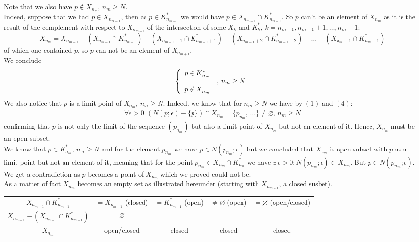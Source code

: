 Note that we also have $p\not \in X_{n_m},\, n_m\geq N$.\\ Indeed, suppose that we had $p\in X_{n_{m-1}}$, then as $p\in K^{*}_{n_{m-1}}$ we would have $p\in X_{n_{m-1}}\cap K^{*}_{n_{m-1}}$. So $p$ can't be an element of  $X_{n_{m}}$ as it is the result of the complement with respect to $X_{n_{m-1}}$ of the intersection of some $X_{k}$ and $K^{*}_{k},\ k=n_{m-1},n_{m-1}+1,\dots, n_{m}-1$:
$$ X_{n_{m}}=X_{n_{m-1}}- ( X_{n_{m-1}}\cap K^{*}_{n_{m-1}})- ( X_{n_{m-1}+1}\cap K^{*}_{n_{m-1}+1})- ( X_{n_{m-1}+2}\cap K^{*}_{n_{m-1}+2})-\dots - ( X_{n_{m}-1}\cap K^{*}_{n_{m}-1})$$
of which one contained $p$, so $p$ can not be an element of $X_{n_{m+1}}$.\\
We conclude
\begin{align*}
\left\{\begin{array}{l l}
p\in  K^{*}_{n_m}\\
&,\, n_m\geq N\\
p\not \in  X^{}_{n_m}
\end{array}\right.
\end{align*}
We also notice that $p$ is a limit point of $X_{n_{m}},\, n_m\geq N$. Indeed, we know that for $n_m\geq N$ we have by $(1)$ and $(4)$:
\begin{align*}
\forall\epsilon >0: \left(N(p;\epsilon)-\{p\}\right)\cap X_{n_m}=\{p_{n_m},\, \dots \}\neq \varnothing,\, n_m\geq N
\end{align*}
confirming that $p$ is not only the limit of the sequence $(p_{n_m})$ but also a limit point of $X^{}_{n_m}$ but not an element of it. Hence, $X^{}_{n_m}$ must be an open subset.\\
We know that $p\in K^{*}_{n_m},\, n_m\geq N$ and for the element $p_{n_m}$ we have $p\in N(p_{n_m};\epsilon)$ but we concluded that $X^{}_{n_m}$ is open subset with $p$ as a limit point but not an element of it, meaning that for the point $p_{n_m}\in X_{n_m}\cap K^{*}_{n_m}$ we have $\exists\,  \epsilon>0: N(p_{n_m};\epsilon)\subset X_{n_m}$. But $p\in N(p_{n_m};\epsilon)$. We get a contradiction as $p$ becomes a point of $X_{n_m} $ which we proved could not be.\\
As a matter of fact $X_{n_m}$ becomes an empty set as illustrated hereunder (starting with $X_{n_{m-1}}$, a closed susbet).
\begin{table}[H]
\centering
\begin{tabular}{|c|c|c|c|c|}
\hline
& &  &  & \\ 
\hline
 $X_{n_{m-1}}\cap K^{*}_{n_{m-1}}$ &  $=X_{n_{m-1}}$ (closed) &    $=K^{*}_{n_{m-1}}$ (open)& $\neq\varnothing$ (open) &  $=\varnothing$  (open/closed)\\ 
 \hline
 $X_{n_{m-1}}-(X_{n_{m-1}}\cap K^{*}_{n_{m-1}})$& $\varnothing$&  &  & \\ 
\hline
 $X_{n_{m}}$  &  open/closed &    closed & closed &  closed\\ \hline
\end{tabular}
\end{table}
